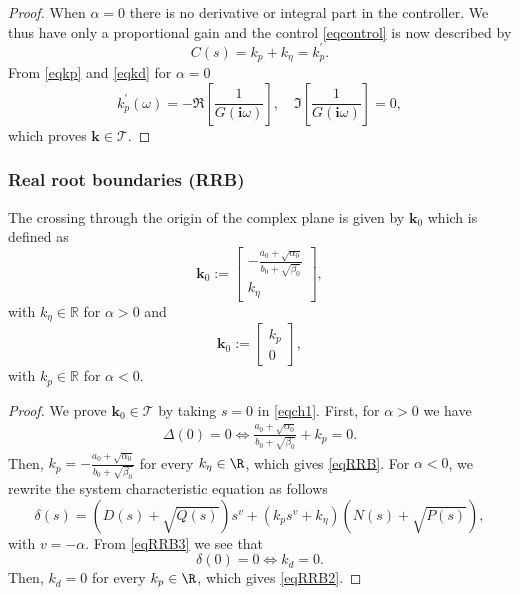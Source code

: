 \documentclass[twoside,reqno,11pt]{fcaa-var} %
\begin{document}
\begin{proof}
	When $\alpha=0$ there is no derivative or integral part in the controller. We thus have only a proportional gain and the control \eqref{eqcontrol} is now described by
	\begin{equation}
	C(s)=k_p+k_\eta=k_p^\prime. \label{proportionalc}
	\end{equation}
From \eqref{eqkp} and \eqref{eqkd} for $\alpha=0$
\begin{equation}
	k_p^\prime(\omega)=-\Re\!\left[\frac{1}{G(\bm{i}\omega)}\right] ,\quad \Im\!\left[\frac{1}{G(\bm{i}\omega)}\right]=0,
\end{equation}
which proves $\mathbf{k}\in\mathcal{T}$.
\end{proof}
\subsubsection{Real root boundaries (RRB)}
\begin{proposition}\label{prop:RRB}
	The crossing through the origin of the complex plane is given by $\mathbf{k}_0$ which is defined as
	\begin{equation}
	\mathbf{k}_0:=\begin{bmatrix} -\frac{a_0+\sqrt{\alpha_0}}{b_0+\sqrt{\beta_0}}\\ k_\eta \end{bmatrix},\label{eqRRB}
	\end{equation}
	with $k_\eta\in\mathbb{R}$ for $\alpha>0$ and
	\begin{equation}
	\mathbf{k}_0:=\begin{bmatrix} k_p\\ 0 \end{bmatrix},\label{eqRRB2}
	\end{equation}
	with $k_p\in\mathbb{R}$ for $\alpha<0$.\par
	\begin{proof} We prove $\mathbf{k}_0\in\mathcal{T}$ by taking $s=0$ in \eqref{eqch1}. First, for $\alpha>0$ we  have
		\begin{eqnarray}
		\Delta(0)=0 \iff \frac{a_0+\sqrt{\alpha_0}}{b_0+\sqrt{\beta_0}}+k_p=0.
		\end{eqnarray}
		Then, $k_p=-\frac{a_0+\sqrt{\alpha_0}}{b_0+\sqrt{\beta_0}}$ for every $k_\eta\in\R$, which gives \eqref{eqRRB}. For $\alpha<0$, we rewrite the system characteristic equation as follows
		\begin{equation}
		\delta(s)=(D(s)+\sqrt{Q(s)})s^v+(k_ps^v+k_\eta)(N(s)+\sqrt{P(s)}),\label{eqRRB3}
		\end{equation}
		with $v=-\alpha$. From \eqref{eqRRB3} we see that 
		\begin{equation}
		\delta(0)=0 \iff k_d=0.
		\end{equation}
		Then, $k_d=0$ for every $k_p\in\R$, which gives \eqref{eqRRB2}.
	\end{proof}
\end{proposition}
\end{document}
